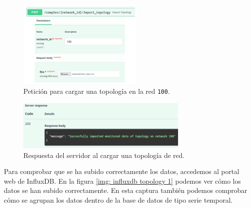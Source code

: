 \documentclass[a4paper, oneside, 12pt]{book}
\begin{document}
 	\begin{figure}[h!]
 		\begin{center}
 			\includegraphics[width=0.55\textwidth]{diag/request_topology_1.png}
 			\caption{Petición para cargar una topología en la red \texttt{100}.}
 			\label{img: request topology 1}
 		\end{center}
 	\end{figure}
 
 	\begin{figure}[h!]
 		\begin{center}
 			\includegraphics[width=0.75\textwidth]{img/response_topology_1.png}
 			\caption{Respuesta del servidor al cargar una topología de red.}
 			\label{img: response topology 1}
 		\end{center}
 	\end{figure}
	
	\pagebreak
	
	\noindent Para comprobar que se ha subido correctamente los datos, accedemos al portal web de InfluxDB. En la figura \ref{img: influxdb topology 1} podemos ver cómo los datos se han subido correctamente. En esta captura también podemos comprobar cómo se agrupan los datos dentro de la base de datos de tipo serie temporal. 
	
\end{document}

